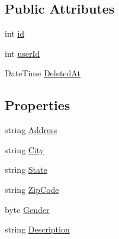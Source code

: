 \subsection*{Public Attributes}
\begin{DoxyCompactItemize}
\item 
int \hyperlink{class_shame_the_thrones_1_1_models_1_1_restroom_model_aa40cb126c8e366c08de4764b232613ce}{id}
\item 
int \hyperlink{class_shame_the_thrones_1_1_models_1_1_restroom_model_a5095c1bb7c293fc99ad051f813a03eef}{user\+Id}
\item 
Date\+Time \hyperlink{class_shame_the_thrones_1_1_models_1_1_restroom_model_a924a6a23f99df670ce5b4a0239516861}{Deleted\+At}
\end{DoxyCompactItemize}
\subsection*{Properties}
\begin{DoxyCompactItemize}
\item 
string \hyperlink{class_shame_the_thrones_1_1_models_1_1_restroom_model_a5cfa3121cee5ea93291d7c85030ad10f}{Address}
\item 
string \hyperlink{class_shame_the_thrones_1_1_models_1_1_restroom_model_a31f126bbea3635bcc3edba48564c8d55}{City}
\item 
string \hyperlink{class_shame_the_thrones_1_1_models_1_1_restroom_model_a9fdfb3a463e0c0b0b3e981e14c5c8765}{State}
\item 
string \hyperlink{class_shame_the_thrones_1_1_models_1_1_restroom_model_a4aee96f9372eca583bb633f2918265b4}{Zip\+Code}
\item 
byte \hyperlink{class_shame_the_thrones_1_1_models_1_1_restroom_model_a03504f0f46e8f204701e35802c4c0f53}{Gender}
\item 
string \hyperlink{class_shame_the_thrones_1_1_models_1_1_restroom_model_ad73a6f748fd7865d426887bfeec8d6da}{Description}
\end{DoxyCompactItemize}


